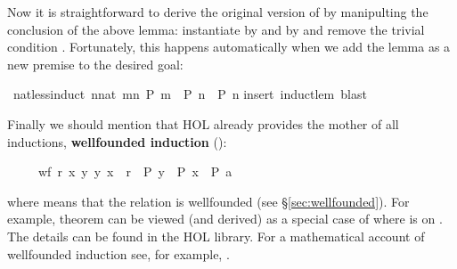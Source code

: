 \begin{isabellebody}
\begin{isamarkuptext}
Now it is straightforward to derive the original version of
 by manipulting the conclusion of the above lemma:
instantiate  by  and  by  and
remove the trivial condition . Fortunately, this
happens automatically when we add the lemma as a new premise to the
desired goal:%
\end{isamarkuptext}%
\ nat{\isacharunderscore}less{\isacharunderscore}induct{\isacharcolon}\ {\isachardoublequote}{\isacharparenleft}{\isasymAnd}n{\isacharcolon}{\isacharcolon}nat{\isachardot}\ {\isasymforall}m{\isacharless}n{\isachardot}\ P\ m\ {\isasymLongrightarrow}\ P\ n{\isacharparenright}\ {\isasymLongrightarrow}\ P\ n{\isachardoublequote}\isanewline
{}insert\ induct{\isacharunderscore}lem{\isacharcomma}\ blast{\isacharparenright}%
\begin{isamarkuptext}%
Finally we should mention that HOL already provides the mother of all
inductions, \textbf{wellfounded
induction} ():
\begin{isabelle}%
\ \ \ \ \ {\isasymlbrakk}wf\ r{\isacharsemicolon}\ {\isasymAnd}x{\isachardot}\ {\isasymforall}y{\isachardot}\ {\isacharparenleft}y{\isacharcomma}\ x{\isacharparenright}\ {\isasymin}\ r\ {\isasymlongrightarrow}\ P\ y\ {\isasymLongrightarrow}\ P\ x{\isasymrbrakk}\ {\isasymLongrightarrow}\ P\ a%
\end{isabelle}
where  means that the relation  is wellfounded
(see \S\ref{sec:wellfounded}).
For example, theorem  can be viewed (and
derived) as a special case of  where 
 is \isa{{\isacharless}} on . The details can be found in the HOL library.
For a mathematical account of wellfounded induction see, for example, \cite{Baader-Nipkow}.%
\end{isamarkuptext}%
\end{isabellebody}%
